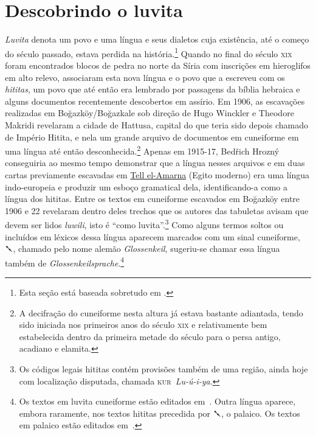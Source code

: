 
\chapter{Descobrindo o luvita}

\emph{Luvita} denota um povo e uma língua e seus dialetos cuja existência,
até o começo do século passado, estava perdida na história.\footnote{Esta seção
	está baseada sobretudo em \textcite{CHLI11,Melchert2003,Hoffner2008}.}
Quando no final do século \textsc{xix} foram encontrados blocos de pedra no
norte da Síria com inscrições em hieroglifos em alto relevo, associaram esta
nova língua e o povo que a escreveu com os \emph{hititas}, um povo que até
então era lembrado por passagens da bíblia hebraica e alguns documentos
recentemente descobertos em assírio.
Em 1906, as escavações realizadas em Boğazköy\slash{}Boğazkale sob direção de
Hugo Winckler e Theodore Makridi revelaram a cidade de Hattusa,
capital do que teria sido depois chamado de Império Hitita, e nela um grande
arquivo de documentos em cuneiforme em uma língua até então
desconhecida.\footnote{A decifração do cuneiforme nesta altura já estava
	bastante adiantada, tendo sido iniciada nos primeiros anos do século
	\textsc{xix} e relativamente bem estabelecida dentro da primeira metade do
	século para o persa antigo, acadiano e elamita.}
Apenas em 1915-17, Bedřich Hrozný conseguiria ao mesmo tempo demonstrar que a
língua nesses arquivos e em duas cartas previamente escavadas em
\href{https://pleiades.stoa.org/places/149576487}{Tell el-Amarna}
(Egito moderno) era uma língua indo-europeia e produzir um esboço gramatical
dela, identificando-a como a língua dos hititas.
Entre os textos em cuneiforme escavados em Boğazköy entre 1906 e 22 revelaram
dentro deles trechos que os autores das tabuletas avisam que devem ser lidos
\emph{luwili}, isto é ``como luvita''.\footnote{Os códigos legais hititas
	contém provisões também de uma região, ainda hoje
	com localização disputada, chamada \mbox{\textsc{kur} \textit{Lu-ú-i-ya}}.}
Como alguns termos soltos ou incluídos em léxicos dessa língua
aparecem marcados com um sinal cuneiforme, \foreignlanguage{hittite}{𒃵}, chamado
pelo nome alemão \emph{Glossenkeil}, sugeriu-se chamar essa língua também de
\emph{Glossenkeilsprache}.\footnote{Os textos em luvita cuneiforme estão
	editados em~\textcites{Starke1985}{YakubovichMouton2023}.
	Outra língua aparece, embora raramente,
	nos textos hititas precedida por \foreignlanguage{hittite}{𒃵}, o palaico. Os
	textos em palaico estão editados em~\textcite{Carruba1970}.}


